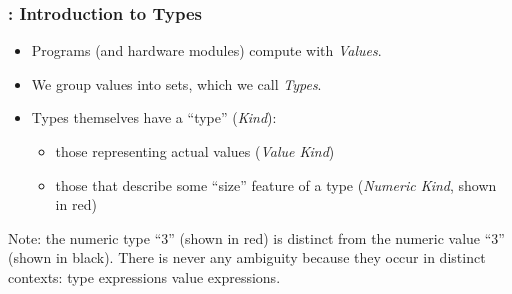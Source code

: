 \begin{frame}[fragile]
\frametitle{{\BSV}: Introduction to Types}

\footnotesize

\begin{center}
\end{center}

\begin{itemize}
 \item Programs (and hardware modules) compute with \emph{Values}.

 \item We group values into sets, which we call \emph{Types}.

 \item Types themselves have a ``type'' (\emph{Kind}):
       \begin{itemize}\footnotesize

        \item those representing actual values (\emph{Value Kind})

	\item those that describe some ``size'' feature of a type
              (\emph{Numeric Kind}, shown in red)

       \end{itemize}

\end{itemize}

Note: the numeric type ``3'' (shown in red) is distinct from the
numeric value ``3'' (shown in black).  There is never any ambiguity
because they occur in distinct contexts: type expressions {\vs} value
expressions.

\end{frame}


